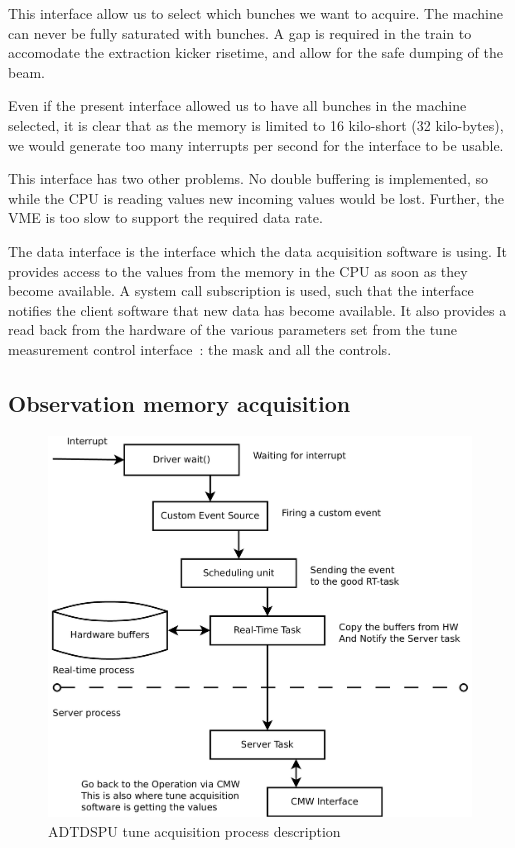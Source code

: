 This interface allow us to select which bunches we want to acquire. The
machine can never be fully saturated with bunches. A gap is required in
the train to accomodate the extraction kicker risetime, and allow for
the safe dumping of the beam.

Even if the present interface allowed us to have all bunches in the
machine selected, it is clear that as the memory is limited to 16
kilo-short (32 kilo-bytes), we would generate too many interrupts per
second for the interface to be usable.

This interface has two other problems. No double buffering is
implemented, so while the \gls{CPU} is reading values new incoming
values would be lost. Further, the \gls{VME} is too slow to support
the required data rate.

The data interface is the interface which the data acquisition software is
using. It provides access to the values from the memory in the
\gls{CPU} as soon as they become available. A system call subscription is
used, such that the interface notifies the client software that new
data has become available. It also provides a read back from the
hardware of the various parameters set from the tune measurement
control interface~: the mask and all the controls.

\subsection{Observation memory acquisition}
\label{sec:obs_mem_acq}

\begin{figure}[H]
\caption{ADTDSPU tune acquisition process description}
\centering
\includegraphics[scale=0.3]{adtdspu_acq.pdf}
\end{figure}

